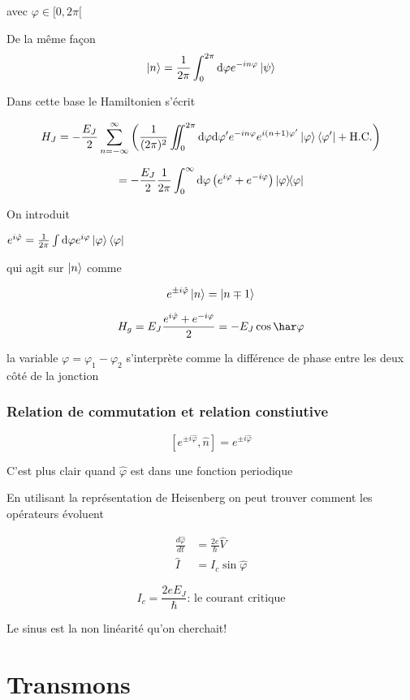 avec $\varphi \in [0, 2\pi[$

De la même façon \[ \ket{n} = \frac{1}{2\pi} \int_{0}^{2\pi}\dd \varphi e^{-in\varphi} \ket{\psi}  \] 

Dans cette base le Hamiltonien s'écrit

\[ H_J = - \frac{E_J}{2} \sum_{n=-\infty}^{\infty} \left( \frac{1}{(2\pi)^2} \iint_0^{2\pi} \dd \varphi \dd \varphi' e^{-in\varphi} e^{i(n+1)\varphi'} \ket{\varphi}\bra{\varphi'} + \text{H.C.}   \right)  \]

\[  = - \frac{E_J}{2} \frac{1}{2\pi} \int_{0}^{\infty}\dd \varphi \left( e^{i\varphi} + e^{-i\varphi} \right) \ketbra{\varphi}  \]


On introduit

$e^{i \hat \varphi} =  \frac{1}{2\pi} \int \dd \varphi e^{i\varphi} \ket{\varphi}\bra{\varphi}$


qui agit sur $\ket{n}$ comme

\[ e^{\pm i \hat \varphi} \ket{n} = \ket{n \mp 1}\]

\[ H_g = E_J \frac{e^{i\hat\varphi}+e^{-i \varphi}}{2} = - E_J \cos \har \varphi  \]

la variable $\varphi = \varphi_1 -\varphi_2$ s'interprète comme la différence de phase entre les deux côté de la jonction

\subsubsection{Relation de commutation et relation constiutive}


\[ [e^{\pm{}i\hat\varphi}, \hat{n}] = e^{\pm i \hat \varphi}  \]


C'est plus clair quand $\hat \varphi$ est dans une fonction periodique

En utilisant la représentation de Heisenberg on peut trouver comment les opérateurs évoluent 


\begin{align}
    \frac{d {\hat \varphi}}{d {t}} &= \frac{2e}{\hbar} \hat V\\
    \hat I &= I_c \sin \hat \varphi
\end{align}


\[I_c = \frac{2e E_{J}}{\hbar} \text{: le courant critique}   \]


Le sinus est la non linéarité qu'on cherchait!


\section{Transmons}


